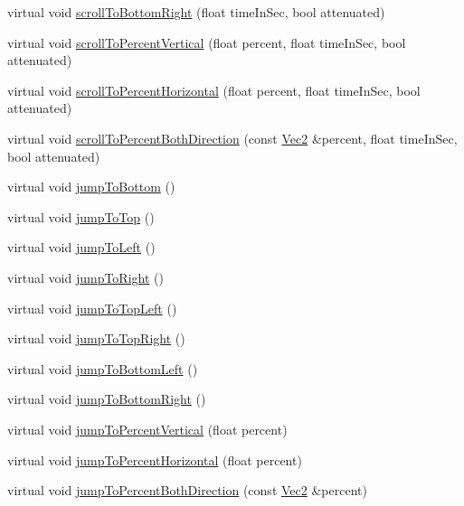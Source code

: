 \begin{DoxyCompactItemize}
\item 
virtual void \hyperlink{classui_1_1ScrollView_ab9106c7aac0bd2473833685085199186}{scroll\+To\+Bottom\+Right} (float time\+In\+Sec, bool attenuated)
\item 
virtual void \hyperlink{classui_1_1ScrollView_aa668d0a8d5871ed08dea6e227b2e2aaf}{scroll\+To\+Percent\+Vertical} (float percent, float time\+In\+Sec, bool attenuated)
\item 
virtual void \hyperlink{classui_1_1ScrollView_a5d87423e0b9c1c8d0a3310d58dcf6d9e}{scroll\+To\+Percent\+Horizontal} (float percent, float time\+In\+Sec, bool attenuated)
\item 
virtual void \hyperlink{classui_1_1ScrollView_aaa0cee9e0a1c8c2c3cb43253eccfaeef}{scroll\+To\+Percent\+Both\+Direction} (const \hyperlink{classVec2}{Vec2} \&percent, float time\+In\+Sec, bool attenuated)
\item 
virtual void \hyperlink{classui_1_1ScrollView_a239246ce0e70711ca19504badf56db13}{jump\+To\+Bottom} ()
\item 
virtual void \hyperlink{classui_1_1ScrollView_abdc304338a86f1fd0cea613fca25ffef}{jump\+To\+Top} ()
\item 
virtual void \hyperlink{classui_1_1ScrollView_a997d4610191286c00079f1b75062f5a5}{jump\+To\+Left} ()
\item 
virtual void \hyperlink{classui_1_1ScrollView_ade536205c63207b9efdf6d2dac9631ae}{jump\+To\+Right} ()
\item 
virtual void \hyperlink{classui_1_1ScrollView_ac61119b9f40bf3a81e3a71e3d84c0c90}{jump\+To\+Top\+Left} ()
\item 
virtual void \hyperlink{classui_1_1ScrollView_ae2496521c218e2e53a364d98f223883b}{jump\+To\+Top\+Right} ()
\item 
virtual void \hyperlink{classui_1_1ScrollView_aa06afeba18463d129dfdc3a9352aaf4a}{jump\+To\+Bottom\+Left} ()
\item 
virtual void \hyperlink{classui_1_1ScrollView_a71e1de6f85955a4d4b96931244bffd22}{jump\+To\+Bottom\+Right} ()
\item 
virtual void \hyperlink{classui_1_1ScrollView_a64f1cc13581ea0173bf708bb10198c2f}{jump\+To\+Percent\+Vertical} (float percent)
\item 
virtual void \hyperlink{classui_1_1ScrollView_ab3816071846ac5c8d4b5b4ae3c3ee5a5}{jump\+To\+Percent\+Horizontal} (float percent)
\item 
virtual void \hyperlink{classui_1_1ScrollView_a288c35e8d899c4455f5574099fc17d1d}{jump\+To\+Percent\+Both\+Direction} (const \hyperlink{classVec2}{Vec2} \&percent)

\end{DoxyCompactItemize}
